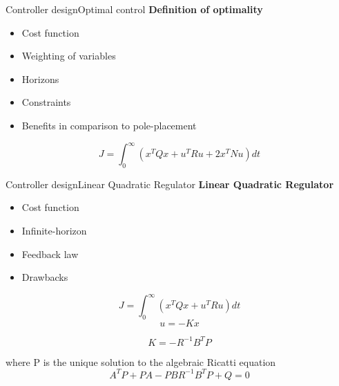 \begin{frame}{Controller design}{Optimal control}
	 \textbf{Definition of optimality}
	 \begin{itemize}
	 	\item Cost function
	 	\item Weighting of variables
	 	\item Horizons
	 	\item Constraints
	 	\item Benefits in comparison to pole-placement 
	 \end{itemize}
 
\begin{equation} \label{eq:lqr_cost_fcn}
	J = \int_0^{\infty} \left(x^TQx + u^TRu + 2x^TNu\right)dt
\end{equation}

\end{frame}


\begin{frame}{Controller design}{Linear Quadratic Regulator}
	 \textbf{Linear Quadratic Regulator}
	\begin{itemize}
		\item Cost function
		\item Infinite-horizon 
		\item Feedback law
		\item Drawbacks
	\end{itemize}

\begin{equation} \label{eq:lqr_cost_fcn}
	J = \int_0^{\infty} \left(x^TQx + u^TRu\right)dt
\end{equation}
\begin{equation} \label{eq:lqr_cost_fcn}
	u = -Kx
\end{equation}

\begin{equation} \label{eq:lqr_K}
	K = -R^{-1}B^{T}P
\end{equation}

where P is the unique solution to the algebraic Ricatti equation
\begin{equation} \label{eq:ricatti}
	A^TP + PA - PBR^{-1}B^TP+Q = 0
\end{equation}

\end{frame}



